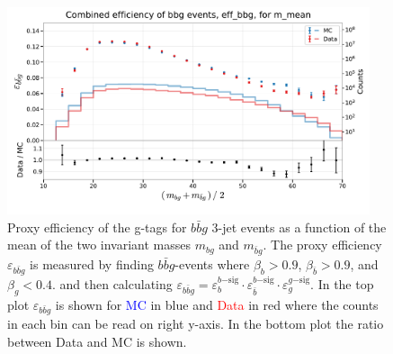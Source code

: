 \begin{figure}
  \centerfloat
  \includegraphics[width=0.95\textwidth, trim=0 0 0 40, clip]{figures/quarks/eff_bbg_m_mean-down_sample=1.00-ML_vars=vertex-selection=b-ejet_min=4-n_iter_RS_lgb=99-n_iter_RS_xgb=9-cdot_cut=0.90-version=19.pdf}
  \caption[g-Tagging proxy efficiency for $b\bar{b}g$-events as function of the mean invariant mass]
          {Proxy efficiency of the g-tags for $b\bar{b}g$ 3-jet events as a function of the mean of the two invariant masses $m_{bg}$ and $m_{\bar{b}g}$. The proxy efficiency $\varepsilon_{b\bar{b}g}$ is measured by finding $b\bar{b}g$-events where $\beta_b > 0.9$, $\beta_{\bar{b}}>0.9$, and $\beta_g < 0.4$. and then calculating  $\varepsilon_{b\bar{b}g} = \varepsilon_b^{b\mathrm{-sig}} \cdot \varepsilon_{\bar{b}}^{b\mathrm{-sig}} \cdot  \varepsilon_g^{g\mathrm{-sig}} $. In the top plot $\varepsilon_{b\bar{b}g}$ is shown for \textcolor{blue}{MC} in blue and \textcolor{red}{Data} in red where the counts in each bin can be read on right y-axis. In the bottom plot the ratio between Data and MC is shown.
          } 
  \label{fig:q:effiency_btag_bbg_m_mean}
\end{figure}


